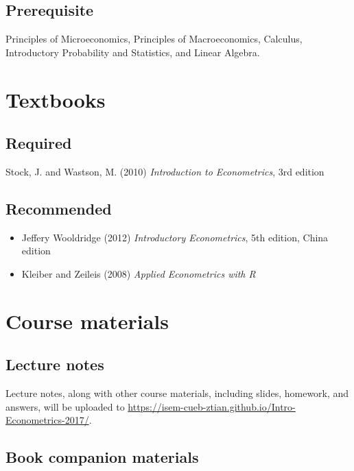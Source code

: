 \documentclass[a4paper,11pt]{article}
\begin{document}
\subsection*{Prerequisite}
\label{sec:orgff360c1}

Principles of Microeconomics, Principles of Macroeconomics, Calculus,
Introductory Probability and Statistics, and Linear Algebra.


\section{Textbooks}
\label{sec:orgd313b00}
\subsection*{Required}
\label{sec:org64992cd}

Stock, J. and Wastson, M. (2010) \emph{Introduction to Econometrics}, 3rd
edition

\subsection*{Recommended}
\label{sec:org2ff64a2}

\begin{itemize}
\item Jeffery Wooldridge (2012) \emph{Introductory Econometrics}, 5th edition, China edition

\item Kleiber and Zeileis (2008) \emph{Applied Econometrics with R}
\end{itemize}


\section{Course materials}
\label{sec:org76ae7bd}
\subsection*{Lecture notes}
\label{sec:org6faa444}

Lecture notes, along with other course materials, including slides,
homework, and answers, will be uploaded to
\url{https://isem-cueb-ztian.github.io/Intro-Econometrics-2017/}. 

\subsection*{Book companion materials}
\label{sec:org0269e39}
\end{document}
